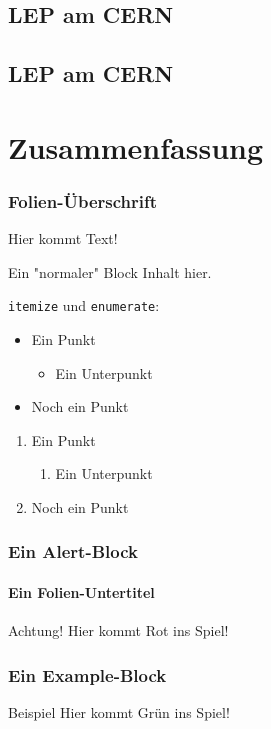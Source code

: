 \documentclass[german, ngerman]{beamer}
\begin{document}
\subsection{LEP am CERN}
\subsection{LEP am CERN}
\section{Zusammenfassung}

\begin{frame}
	\frametitle{Folien-Überschrift}

	Hier kommt Text!

	\begin{block}{Ein "normaler" Block}
		Inhalt hier.
	\end{block}

	\texttt{itemize} und \texttt{enumerate}:
	\begin{itemize}
		\item Ein Punkt
		\begin{itemize}
			\item Ein Unterpunkt
		\end{itemize}
		\item Noch ein Punkt
	\end{itemize}
	\begin{enumerate}
		\item Ein Punkt
		\begin{enumerate}
			\item Ein Unterpunkt
		\end{enumerate}
		\item Noch ein Punkt
	\end{enumerate}
\end{frame}

\begin{frame}
	\frametitle{Ein Alert-Block}
	\framesubtitle{Ein Folien-Untertitel}

	\begin{alertblock}{Achtung!}
		Hier kommt Rot ins Spiel!
	\end{alertblock}
\end{frame}

\begin{frame}
	\frametitle{Ein Example-Block}

	\begin{exampleblock}{Beispiel}
		Hier kommt Grün ins Spiel!
	\end{exampleblock}
\end{frame}
\end{document}
